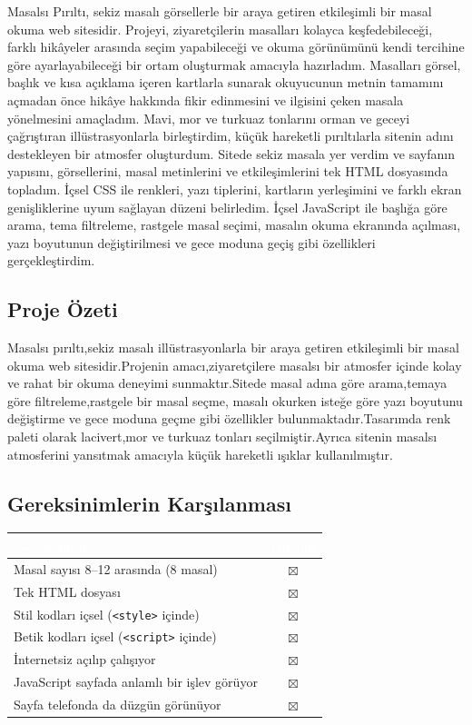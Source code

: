 \documentclass[12pt,a4paper]{article}
\begin{document}
Masalsı Pırıltı, sekiz masalı görsellerle bir araya getiren etkileşimli bir masal okuma web sitesidir. Projeyi, ziyaretçilerin masalları kolayca keşfedebileceği, farklı hikâyeler arasında seçim yapabileceği ve okuma görünümünü kendi tercihine göre ayarlayabileceği bir ortam oluşturmak amacıyla hazırladım. Masalları görsel, başlık ve kısa açıklama içeren kartlarla sunarak okuyucunun metnin tamamını açmadan önce hikâye hakkında fikir edinmesini ve ilgisini çeken masala yönelmesini amaçladım. Mavi, mor ve turkuaz tonlarını orman ve geceyi çağrıştıran illüstrasyonlarla birleştirdim, küçük hareketli pırıltılarla sitenin adını destekleyen bir atmosfer oluşturdum. Sitede sekiz masala yer verdim ve sayfanın yapısını, görsellerini, masal metinlerini ve etkileşimlerini tek HTML dosyasında topladım. İçsel CSS ile renkleri, yazı tiplerini, kartların yerleşimini ve farklı ekran genişliklerine uyum sağlayan düzeni belirledim. İçsel JavaScript ile başlığa göre arama, tema filtreleme, rastgele masal seçimi, masalın okuma ekranında açılması, yazı boyutunun değiştirilmesi ve gece moduna geçiş gibi özellikleri gerçekleştirdim.

\subsection{Proje Özeti}
Masalsı pırıltı,sekiz masalı illüstrasyonlarla bir araya getiren etkileşimli bir masal okuma web sitesidir.Projenin amacı,ziyaretçilere masalsı bir atmosfer içinde kolay ve rahat bir okuma deneyimi sunmaktır.Sitede masal adına göre arama,temaya göre filtreleme,rastgele bir masal seçme, masalı okurken isteğe göre yazı boyutunu değiştirme ve gece moduna geçme gibi özellikler bulunmaktadır.Tasarımda renk paleti olarak lacivert,mor ve turkuaz tonları seçilmiştir.Ayrıca sitenin masalsı atmosferini yansıtmak amacıyla küçük hareketli ışıklar kullanılmıştır.

\subsection{Gereksinimlerin Karşılanması}
\begin{center}
\begin{tabular}{@{}p{8.2cm}c@{}}
\toprule
\rowcolor{ana}\textcolor{white}{\textbf{Gereksinim}} & \textcolor{white}{\textbf{Durum}} \\
\midrule
Masal sayısı 8--12 arasında (8 masal)         & $\boxtimes$ \\
Tek HTML dosyası                                    & $\boxtimes$ \\
Stil kodları içsel (\texttt{<style>} içinde)        & $\boxtimes$ \\
Betik kodları içsel (\texttt{<script>} içinde)      & $\boxtimes$ \\
İnternetsiz açılıp çalışıyor                        & $\boxtimes$ \\
JavaScript sayfada anlamlı bir işlev görüyor        & $\boxtimes$ \\
Sayfa telefonda da düzgün görünüyor                 & $\boxtimes$ \\
\bottomrule
\end{tabular}
\end{center}
\end{document}
